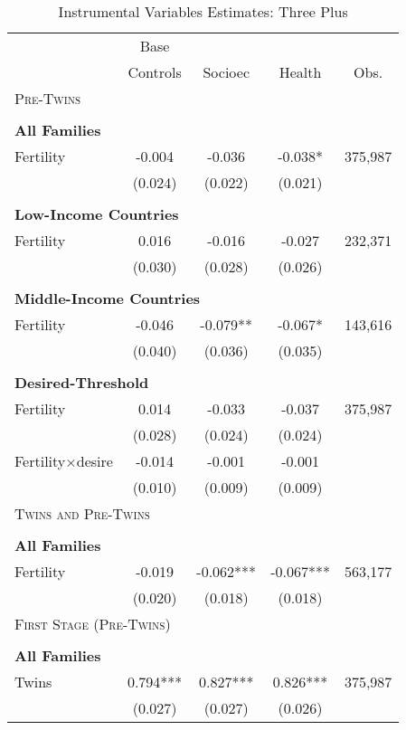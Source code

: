 \begin{table}[!htbp] \centering 
\caption{Instrumental Variables Estimates: Three Plus} 
\label{TWINtab:IVThreeplus} 
\begin{tabular}{lcccc} \toprule \toprule 
&Base&&&\\
&Controls&Socioec&Health&Obs.\\\midrule
\multicolumn{5}{l}{\textsc{Pre-Twins}}\\ 
&&&&\\
\multicolumn{5}{l}{\textbf{All Families}}\\ 
Fertility&-0.004&-0.036&-0.038*&375,987\\
         &(0.024)&(0.022)&(0.021)&\\
&&&&\\
\multicolumn{5}{l}{\textbf{Low-Income Countries}}\\ 
Fertility&0.016&-0.016&-0.027&232,371\\
         &(0.030)&(0.028)&(0.026)&\\
&&&&\\
\multicolumn{5}{l}{\textbf{Middle-Income Countries}}\\ 
Fertility&-0.046&-0.079**&-0.067*&143,616\\
         &(0.040)&(0.036)&(0.035)&\\
&&&&\\
\multicolumn{5}{l}{\textbf{Desired-Threshold}}\\ 
Fertility&0.014&-0.033&-0.037&375,987\\
         &(0.028)&(0.024)&(0.024)&\\
Fertility$\times$desire&-0.014&-0.001&-0.001&\\
         &(0.010)&(0.009)&(0.009)&\\
\midrule\multicolumn{5}{l}{\textsc{Twins and Pre-Twins}}\\ 
&&&&\\
\multicolumn{5}{l}{\textbf{All Families}}\\ 
Fertility&-0.019&-0.062***&-0.067***&563,177\\
         &(0.020)&(0.018)&(0.018)&\\
\midrule\multicolumn{5}{l}{\textsc{First Stage (Pre-Twins)}}\\ 
&&&&\\
\multicolumn{5}{l}{\textbf{All Families}}\\ 
Twins&0.794***&0.827***&0.826***&375,987\\
         &(0.027)&(0.027)&(0.026)&\\

\end{tabular}
\end{table}
